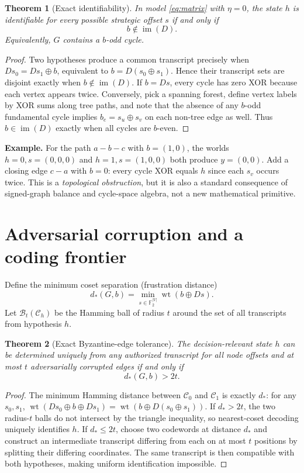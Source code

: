 \documentclass[10pt,a4paper]{article}
\newtheorem{theorem}{Theorem}
\theoremstyle{definition}\newtheorem{definition}[theorem]{Definition}
\newcommand{\F}{\mathbb F_2}
\newcommand{\wt}{\operatorname{wt}}
\newcommand{\im}{\operatorname{im}}
\begin{document}
\begin{theorem}[Exact identifiability]\label{thm:zero}
In model \eqref{eq:matrix} with $\eta=0$, the state $h$ is identifiable for every possible strategic offset $s$ if and only if
\[
 b\notin\im(D).
\]
Equivalently, $G$ contains a $b$-odd cycle.
\end{theorem}
\begin{proof}
Two hypotheses produce a common transcript precisely when $Ds_0=Ds_1\oplus b$, equivalent to $b=D(s_0\oplus s_1)$. Hence their transcript sets are disjoint exactly when $b\notin\im(D)$. If $b=Ds$, every cycle has zero XOR because each vertex appears twice. Conversely, pick a spanning forest, define vertex labels by XOR sums along tree paths, and note that the absence of any $b$-odd fundamental cycle implies $b_e=s_u\oplus s_v$ on each non-tree edge as well. Thus $b\in\im(D)$ exactly when all cycles are $b$-even.
\end{proof}

\textbf{Example.} For the path $a-b-c$ with $b=(1,0)$, the worlds $h=0,s=(0,0,0)$ and $h=1,s=(1,0,0)$ both produce $y=(0,0)$. Add a closing edge $c-a$ with $b=0$: every cycle XOR equals $h$ since each $s_v$ occurs twice. This is a \emph{topological obstruction}, but it is also a standard consequence of signed-graph balance and cycle-space algebra, not a new mathematical primitive.

\section{Adversarial corruption and a coding frontier}
Define the minimum coset separation (frustration distance)
\begin{equation}\label{eq:dist}
 d_*(G,b)=\min_{s\in\F^{|V|}}\wt(b\oplus Ds).
\end{equation}
Let $\mathcal B_t(\mathcal C_h)$ be the Hamming ball of radius $t$ around the set of all transcripts from hypothesis $h$.

\begin{theorem}[Exact Byzantine-edge tolerance]\label{thm:t}
The decision-relevant state $h$ can be determined uniquely from any authorized transcript for all node offsets and at most $t$ adversarially corrupted edges if and only if
\begin{equation}\label{eq:threshold}
 d_*(G,b)>2t.
\end{equation}
\end{theorem}
\begin{proof}
The minimum Hamming distance between $\mathcal C_0$ and $\mathcal C_1$ is exactly $d_*$: for any $s_0,s_1$, $\wt(Ds_0\oplus b\oplus Ds_1)=\wt(b\oplus D(s_0\oplus s_1))$. If $d_*>2t$, the two radius-$t$ balls do not intersect by the triangle inequality, so nearest-coset decoding uniquely identifies $h$. If $d_*\le2t$, choose two codewords at distance $d_*$ and construct an intermediate transcript differing from each on at most $t$ positions by splitting their differing coordinates. The same transcript is then compatible with both hypotheses, making uniform identification impossible.
\end{proof}
\end{document}
